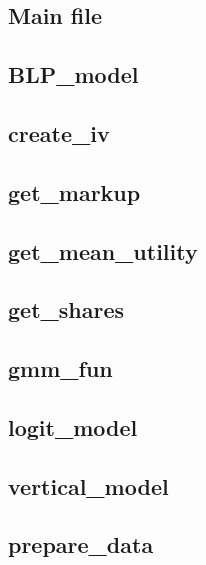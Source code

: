 \documentclass[12pt]{article}
\newcommand{\1}{{\bf 1}} %
\begin{document}
\subsection*{Main file}

\subsection*{BLP\_model}

\subsection*{create\_iv}

\subsection*{get\_markup}

\subsection*{get\_mean\_utility}

\subsection*{get\_shares}

\subsection*{gmm\_fun}

\subsection*{logit\_model}

\subsection*{vertical\_model}

\subsection*{prepare\_data}

\end{document}
